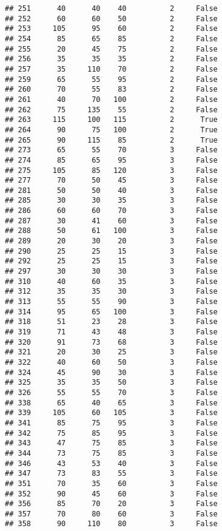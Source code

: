 \documentclass[
]{article}
\begin{document}
\begin{verbatim}
## 251      40      40    40          2     False
## 252      60      60    50          2     False
## 253     105      95    60          2     False
## 254      85      65    85          2     False
## 255      20      45    75          2     False
## 256      35      35    35          2     False
## 257      35     110    70          2     False
## 259      65      55    95          2     False
## 260      70      55    83          2     False
## 261      40      70   100          2     False
## 262      75     135    55          2     False
## 263     115     100   115          2      True
## 264      90      75   100          2      True
## 265      90     115    85          2      True
## 273      65      55    70          3     False
## 274      85      65    95          3     False
## 275     105      85   120          3     False
## 277      70      50    45          3     False
## 281      50      50    40          3     False
## 285      30      30    35          3     False
## 286      60      60    70          3     False
## 287      30      41    60          3     False
## 288      50      61   100          3     False
## 289      20      30    20          3     False
## 290      25      25    15          3     False
## 292      25      25    15          3     False
## 297      30      30    30          3     False
## 310      40      60    35          3     False
## 312      35      35    30          3     False
## 313      55      55    90          3     False
## 314      95      65   100          3     False
## 318      51      23    28          3     False
## 319      71      43    48          3     False
## 320      91      73    68          3     False
## 321      20      30    25          3     False
## 322      40      60    50          3     False
## 324      45      90    30          3     False
## 325      35      35    50          3     False
## 326      55      55    70          3     False
## 338      65      40    65          3     False
## 339     105      60   105          3     False
## 341      85      75    95          3     False
## 342      75      85    95          3     False
## 343      47      75    85          3     False
## 344      73      75    85          3     False
## 346      43      53    40          3     False
## 347      73      83    55          3     False
## 351      70      35    60          3     False
## 352      90      45    60          3     False
## 356      85      70    20          3     False
## 357      70      80    60          3     False
## 358      90     110    80          3     False

\end{verbatim}
\end{document}
